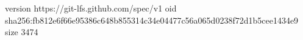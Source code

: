 version https://git-lfs.github.com/spec/v1
oid sha256:fb812e6f66e95386c648b855314c34e04477c56a065d0238f72d1b5cee1434e9
size 3474
